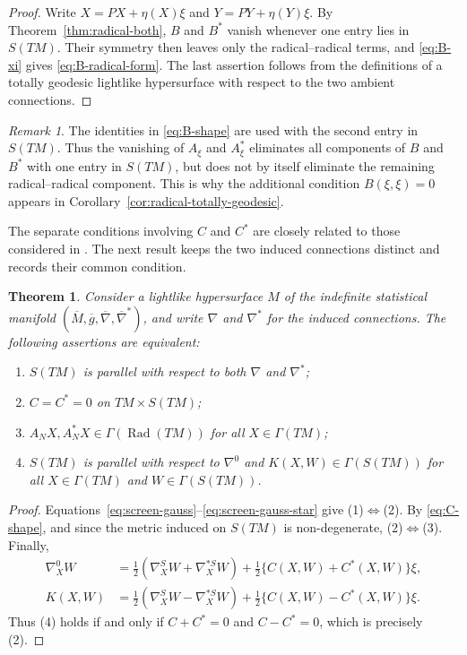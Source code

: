 \documentclass[11pt,a4paper]{article}
\newtheorem{theorem}{Theorem}[section]
\theoremstyle{remark}
\newtheorem*{remark}{Remark}
\theoremstyle{definition}
\newcommand{\Rad}{\operatorname{Rad}}
\begin{document}
\begin{proof}
Write $X=PX+\eta(X)\xi$ and $Y=PY+\eta(Y)\xi$. By
Theorem~\ref{thm:radical-both}, $B$ and $B^{*}$ vanish whenever one
entry lies in $S(TM)$. Their symmetry then leaves only the
radical--radical terms, and \eqref{eq:B-xi} gives
\eqref{eq:B-radical-form}. The last assertion
follows from the definitions of a totally geodesic lightlike hypersurface
with respect to the two ambient connections.
\end{proof}

\begin{remark}
The identities in \eqref{eq:B-shape} are used with the second entry in
$S(TM)$. Thus the vanishing of $A_{\xi}$ and $A_{\xi}^{*}$ eliminates all
components of $B$ and $B^{*}$ with one entry in $S(TM)$, but does not
by itself eliminate the remaining radical--radical component. This is why the additional condition
$B(\xi,\xi)=0$ appears in Corollary~\ref{cor:radical-totally-geodesic}.
\end{remark}

The separate conditions involving $C$ and $C^{*}$ are closely related to
those considered in \cite{RaniKaur2021,BahadirTripathi2023}. The next result keeps the
two induced connections distinct and records their common condition.

\begin{theorem}\label{thm:screen-both}
Consider a lightlike hypersurface $M$ of the indefinite statistical manifold
$(\overline{M},\overline{g},\overline{\nabla},\overline{\nabla}^{*})$, and
write $\nabla$ and $\nabla^{*}$ for the induced connections. The following
assertions are equivalent:
\begin{enumerate}
\item $S(TM)$ is parallel with respect to both $\nabla$ and
$\nabla^{*}$;
\item $C=C^{*}=0$ on $TM\times S(TM)$;
\item $A_NX,A_N^{*}X\in\Gamma(\Rad(TM))$ for all
$X\in\Gamma(TM)$;
\item $S(TM)$ is parallel with respect to $\nabla^{0}$ and
$K(X,W)\in\Gamma(S(TM))$ for all $X\in\Gamma(TM)$ and
$W\in\Gamma(S(TM))$.
\end{enumerate}
\end{theorem}

\begin{proof}
Equations~\eqref{eq:screen-gauss}--\eqref{eq:screen-gauss-star} give
(1)$\Leftrightarrow$(2). By \eqref{eq:C-shape}, and since the metric induced on $S(TM)$ is
non-degenerate, (2)$\Leftrightarrow$(3). Finally,
\begin{align}
\nabla_X^{0}W
&=\frac12(\nabla_X^{S}W+\nabla_X^{*S}W)
 +\frac12\{C(X,W)+C^{*}(X,W)\}\xi,\label{eq:nabla0-screen}\\
K(X,W)
&=\frac12(\nabla_X^{S}W-\nabla_X^{*S}W)
 +\frac12\{C(X,W)-C^{*}(X,W)\}\xi.\label{eq:K-screen}
\end{align}
Thus (4) holds if and only if $C+C^{*}=0$ and $C-C^{*}=0$, which is
precisely (2).
\end{proof}
\end{document}
